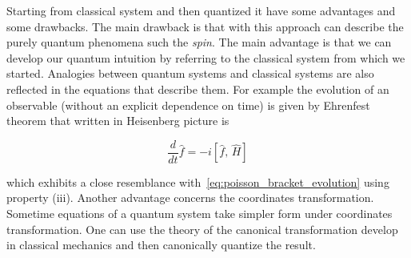 Starting from classical system and then quantized it have some advantages and
some drawbacks. The main drawback is that with this approach can describe the
purely quantum phenomena such the \emph{spin}. The main advantage is that we can
develop our quantum intuition by referring to the classical system from which we
started. Analogies between quantum systems and classical systems are also
reflected in the equations that describe them. For example the evolution of an
observable (without an explicit dependence on time) is given by Ehrenfest theorem
that written in Heisenberg picture is

\begin{equation*}
  \frac{d}{dt} \hat{f} = -i \left[ \hat{f}, \, \hat{H} \right]
\end{equation*}

which exhibits a close resemblance with~\eqref{eq:poisson_bracket_evolution}
using property (iii). Another advantage concerns the coordinates transformation.
Sometime equations of a quantum system take simpler form under coordinates
transformation. One can use the theory of the canonical transformation develop
in classical mechanics and then canonically quantize the result.
